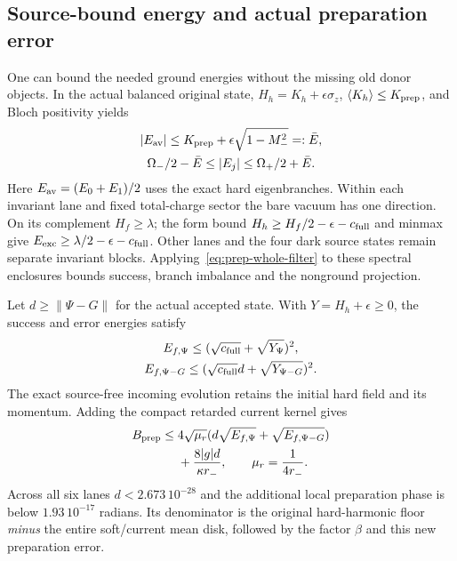 \subsection{Source-bound energy and actual preparation error}
One can bound the needed ground energies without the missing old donor
objects. In the actual balanced original state,
$H_h=K_h+\epsilon\sigma_z$, $\langle K_h\rangle\leq K_{\rm prep}$,
and Bloch positivity yields
\begin{equation}
 \begin{gathered}
 |E_{\rm av}|\leq K_{\rm prep}
       +\epsilon\sqrt{1-M_-^2}=:\bar E,\\
 \Omega_-/2-\bar E\leq|E_j|\leq\Omega_+/2+\bar E.
 \end{gathered}
\end{equation}
Here $E_{\rm av}=(E_0+E_1)/2$ uses the exact hard eigenbranches.
Within each invariant lane and fixed total-charge sector the bare vacuum
has one direction. On its complement $H_f\geq\lambda$; the form bound
$H_h\geq H_f/2-\epsilon-c_{\rm full}$ and minmax give
$E_{\rm exc}\geq\lambda/2-\epsilon-c_{\rm full}$.
Other lanes and the four dark source states remain separate invariant
blocks. Applying~\eqref{eq:prep-whole-filter} to these spectral enclosures
bounds success, branch imbalance and the nonground projection.

Let $d\geq\|\Psi-G\|$ for the actual accepted state. With
$Y=H_h+\epsilon\geq0$, the success and error energies satisfy
\begin{equation}
 \begin{gathered}
 E_{f,\Psi}\leq(\sqrt{c_{\rm full}}+\sqrt{Y_\Psi})^2,\\
 E_{f,\Psi-G}\leq(\sqrt{c_{\rm full}}d+
                         \sqrt{Y_{\Psi-G}})^2.
 \end{gathered}
\end{equation}
The exact source-free incoming evolution retains the initial hard field
and its momentum. Adding the compact retarded current kernel gives
\begin{equation}
 \begin{split}
 B_{\rm prep}\leq{}&4\sqrt{\mu_r}
    (d\sqrt{E_{f,\Psi}}+\sqrt{E_{f,\Psi-G}})\\
 &+\frac{8|g|d}{\kappa r_-},\qquad \mu_r=\frac1{4r_-}.
 \end{split}
\end{equation}
Across all six lanes $d<2.673\,10^{-28}$ and the additional local
preparation phase is below $1.93\,10^{-17}$ radians. Its denominator is
the original hard-harmonic floor \emph{minus} the entire soft/current
mean disk, followed by the factor $\beta$ and this new preparation error.

